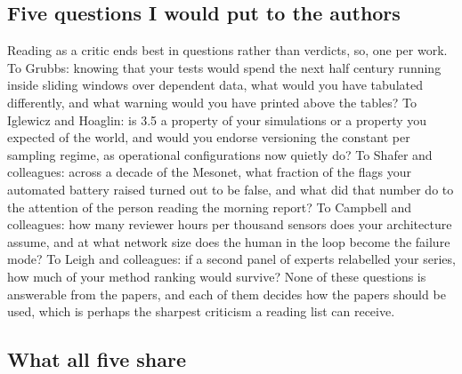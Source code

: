 \subsection{Five questions I would put to the authors}
\label{sec:crit-questions}

Reading as a critic ends best in questions rather than verdicts, so, one per
work. To Grubbs: knowing that your tests would spend the next half century
running inside sliding windows over dependent data, what would you have
tabulated differently, and what warning would you have printed above the
tables? To Iglewicz and Hoaglin: is 3.5 a property of your simulations or a
property you expected of the world, and would you endorse versioning the
constant per sampling regime, as operational configurations now quietly do?
To Shafer and colleagues: across a decade of the Mesonet, what fraction of
the flags your automated battery raised turned out to be false, and what did
that number do to the attention of the person reading the morning report? To
Campbell and colleagues: how many reviewer hours per thousand sensors does
your architecture assume, and at what network size does the human in the
loop become the failure mode? To Leigh and colleagues: if a second panel of
experts relabelled your series, how much of your method ranking would
survive? None of these questions is answerable from the papers, and each of
them decides how the papers should be used, which is perhaps the sharpest
criticism a reading list can receive.

\subsection{What all five share}
\label{sec:crit-shared}


